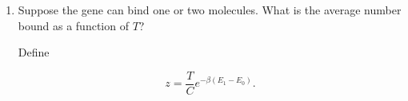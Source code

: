 \documentclass[11pt]{article}
\begin{document}
\begin{enumerate}
Let

\[
M=CV
\]

be the number of boxes and

\[
N=TV
\]

the number of transcription factor molecules.

If the gene is unbound, all \(N\) molecules are free. The number of ways to
place them is

\[
\binom{M}{N},
\]

so the statistical weight is

\[
w_0
=
\binom{M}{N}
e^{-\beta N E_0}.
\]

If the gene is bound, one molecule is on the gene and \(N-1\) are free:

\[
w_1
=
\binom{M}{N-1}
e^{-\beta[(N-1)E_0+E_1]}.
\]

Take the ratio:

\begin{align*}
\frac{w_1}{w_0}
&=
\frac{\binom{M}{N-1}}{\binom{M}{N}}
e^{-\beta(E_1-E_0)} \\
&=
\frac{N}{M-N+1}
e^{-\beta(E_1-E_0)}.
\end{align*}

Since \(M\gg N\),

\[
M-N+1\simeq M.
\]

Thus

\[
\frac{w_1}{w_0}
\simeq
\frac{N}{M}
e^{-\beta(E_1-E_0)}.
\]

Since

\[
\frac{N}{M}
=
\frac{TV}{CV}
=
\frac{T}{C},
\]

we get

\[
\frac{w_1}{w_0}
\simeq
\frac{T}{C}
e^{-\beta(E_1-E_0)}.
\]

Let

\[
r=
\frac{T}{C}
e^{-\beta(E_1-E_0)}.
\]

Then

\[
p_{\mathrm{bound}}
=
\frac{w_1}{w_0+w_1}
=
\frac{r}{1+r}.
\]

Define

\[
K
=
C e^{\beta(E_1-E_0)}.
\]

Since \(r=T/K\),

\[
p_{\mathrm{bound}}
=
\frac{T}{T+K}.
\]

\item Suppose the gene can bind one or two molecules. What is the average
number bound as a function of \(T\)?

Define

\[
z
=
\frac{T}{C}
e^{-\beta(E_1-E_0)}.
\]


\end{enumerate}
\end{document}
